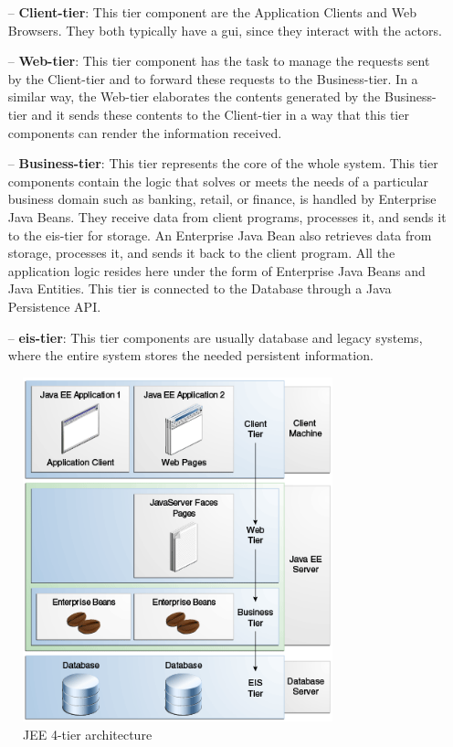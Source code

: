 \begin{itemize}

\item[--]\textbf{Client-tier}: This tier component are the Application Clients and Web Browsers. They both typically have a \acs{gui}, since they interact with the actors.

\item[--]\textbf{Web-tier}: This tier component has the task to manage the requests sent by the Client-tier and to forward these requests to the Business-tier. In a similar way, the Web-tier elaborates the contents generated by the Business-tier and it sends these contents to the Client-tier in a way that this tier components can render the information received.

\item[--]\textbf{Business-tier}: This tier represents the core of the whole system. This tier components contain the logic that solves or meets the needs of a particular business domain such as banking, retail, or finance, is handled by Enterprise Java Beans. They receive data from client programs, processes it, and sends it to the \acs{eis}-tier for storage. An Enterprise Java Bean also retrieves data from storage, processes it, and sends it back to the client program.
All the application logic resides here under the form of Enterprise Java Beans and Java Entities. This tier is connected to the Database through a Java Persistence API.

\item[--]\textbf{\acs{eis}-tier}: This tier components are usually database and legacy systems, where the entire system stores the needed persistent information.

\end{itemize}

\begin{figure}[htbp]
\centering
\includegraphics[width=0.8\textwidth]{Images/jeett_dt_001.png}
\caption{JEE 4-tier architecture}
\label{fig:jeearch}
\end{figure}
\clearpage

